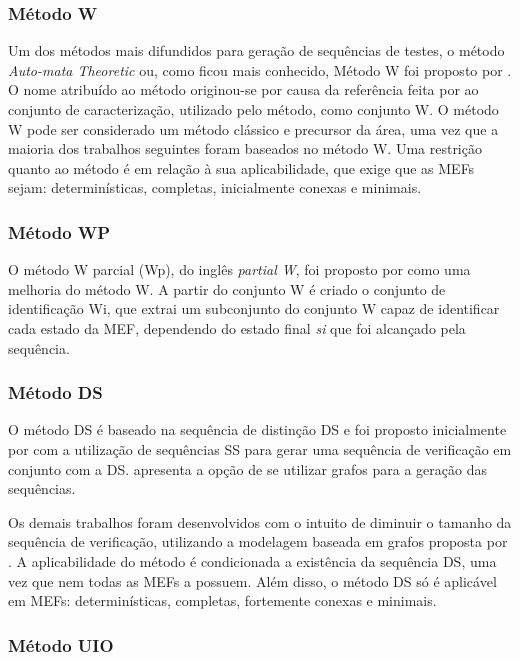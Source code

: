 \subsubsection{Método W}

Um dos métodos mais difundidos para geração de sequências de testes, o método \textit{Auto-mata Theoretic} ou, como ficou mais conhecido, Método W foi proposto por \citet{chow1978testing}. O nome atribuído ao método originou-se por causa da referência feita por \citet{chow1978testing} ao conjunto de caracterização, utilizado pelo método, como conjunto W. O método W pode ser considerado um método clássico e precursor da área, uma vez que a maioria dos trabalhos seguintes foram baseados no método W. Uma restrição quanto ao método é em relação à sua aplicabilidade, que exige que as MEFs sejam: determinísticas, completas, inicialmente conexas e minimais.


\subsubsection{Método WP}

O método W parcial (Wp), do inglês \textit{partial W}, foi proposto por \citet{fujiwara1991test} como uma melhoria do método W. A partir do conjunto W é criado o conjunto de identificação Wi, que extrai um subconjunto do conjunto W capaz de identificar cada estado da MEF, dependendo do estado final \textit{si} que foi alcançado pela sequência.  

\subsubsection{Método DS}

O método DS é baseado na sequência de distinção DS e foi proposto inicialmente por \citet{hennine1964fault} com a utilização de sequências SS para gerar uma sequência de verificação em conjunto com a DS. \citet{gonenc1970method} apresenta a opção de se utilizar grafos para a geração das sequências.

Os demais trabalhos foram desenvolvidos com o intuito de diminuir o tamanho da sequência de verificação, utilizando a modelagem baseada em grafos proposta por \citet{gonenc1970method}. A aplicabilidade do método é condicionada a existência da sequência DS, uma vez que nem todas as MEFs a possuem. Além disso, o método DS só é aplicável em MEFs: determinísticas, completas, fortemente conexas e minimais.

\subsubsection{Método UIO}


